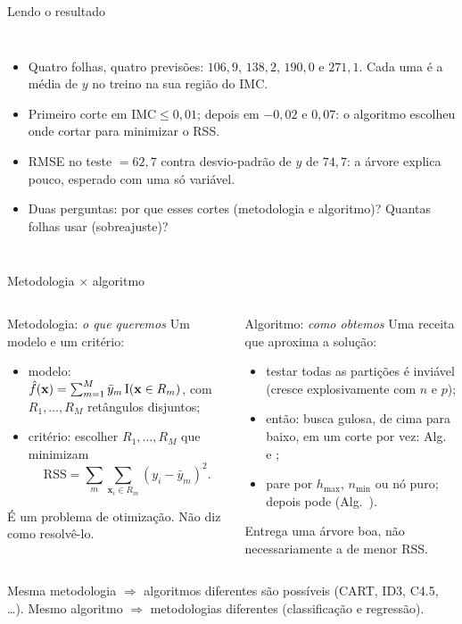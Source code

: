 \begin{frame}[fragile]{Lendo o resultado}
\begin{columns}[T]

\small
\begin{itemize}
  \item Quatro folhas, quatro previsões: $106{,}9$, $138{,}2$, $190{,}0$ e $271{,}1$. Cada uma é a \alert{média} de $y$ no treino na sua região do IMC.
  \item Primeiro corte em $\text{IMC}\le0{,}01$; depois em $-0{,}02$ e $0{,}07$: o algoritmo escolheu \alert{onde} cortar para minimizar o RSS.
  \item RMSE no teste $=62{,}7$ contra desvio-padrão de $y$ de $74{,}7$: a árvore explica \alert{pouco}, esperado com uma só variável.
  \item Duas perguntas: \alert{por que} esses cortes (metodologia e algoritmo)? \alert{Quantas} folhas usar (sobreajuste)?
\end{itemize}
\end{columns}
\end{frame}

\begin{frame}{Metodologia $\times$ algoritmo}
\begin{columns}[T]
\begin{block}{Metodologia: \emph{o que queremos}}
\small
Um \alert{modelo} e um \alert{critério}:
\begin{itemize}
  \item modelo: $\hat f(\mathbf x)=\sum_{m=1}^M \bar y_m\,\mathrm{I}(\mathbf x\in R_m)$, com $R_1,\dots,R_M$ retângulos disjuntos;
  \item critério: escolher $R_1,\dots,R_M$ que minimizam
  \[\mathrm{RSS}=\sum_m\sum_{\mathbf x_i\in R_m}(y_i-\bar y_m)^2 .\]
\end{itemize}
É um \alert{problema de otimização}. Não diz como resolvê-lo.
\end{block}
\begin{block}{Algoritmo: \emph{como obtemos}}
\small
Uma \alert{receita} que aproxima a solução:
\begin{itemize}
  \item testar \alert{todas} as partições é inviável (cresce explosivamente com $n$ e $p$);
  \item então: busca \alert{gulosa}, de cima para baixo, em \alert{um corte por vez}: Alg.~\aGrow{} e \aBest;
  \item pare por $h_{\max}$, $n_{\min}$ ou nó puro; depois pode (Alg.~\aPrune).
\end{itemize}
Entrega uma árvore \alert{boa}, não necessariamente a de menor RSS.
\end{block}
\end{columns}
\vspace{4pt}
\centering\small
Mesma \alert{metodologia} $\Rightarrow$ algoritmos diferentes são possíveis (CART, ID3, C4.5, \dots). Mesmo \alert{algoritmo} $\Rightarrow$ metodologias diferentes (classificação e regressão).
\end{frame}

